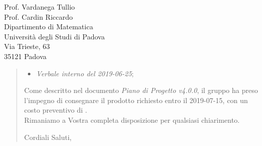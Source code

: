 \begin{letter}{
		Prof. Vardanega Tullio \\
		Prof. Cardin Riccardo \\
		Dipartimento di Matematica \\
		Università degli Studi di Padova \\
		Via Trieste, 63 \\
		35121 Padova}
\begin{quotation}
\begin{itemize}
	\item \textit{Verbale interno del 2019-06-25};
	
	
\end{itemize}

\bigskip

\noindent Come descritto nel documento \textit{Piano di Progetto v4.0.0}, il gruppo ha preso l'impegno di consegnare il prodotto richiesto entro il 2019-07-15, con un costo preventivo di  \textbf{}.\\
Rimaniamo a Vostra completa disposizione per qualsiasi chiarimento.

\vspace{0.5cm}
\closing{ Cordiali Saluti,}
	

\end{quotation}
		
\end{letter}


